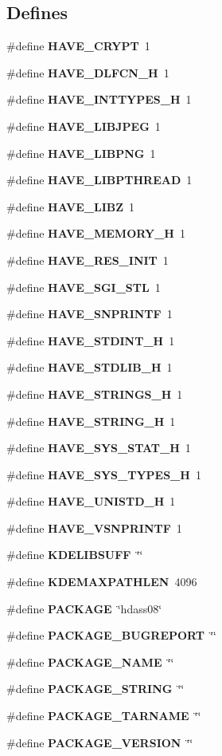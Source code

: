 \subsection*{Defines}
\begin{CompactItemize}
\item 
\#define {\bf HAVE\_\-CRYPT}\ 1
\item 
\#define {\bf HAVE\_\-DLFCN\_\-H}\ 1
\item 
\#define {\bf HAVE\_\-INTTYPES\_\-H}\ 1
\item 
\#define {\bf HAVE\_\-LIBJPEG}\ 1
\item 
\#define {\bf HAVE\_\-LIBPNG}\ 1
\item 
\#define {\bf HAVE\_\-LIBPTHREAD}\ 1
\item 
\#define {\bf HAVE\_\-LIBZ}\ 1
\item 
\#define {\bf HAVE\_\-MEMORY\_\-H}\ 1
\item 
\#define {\bf HAVE\_\-RES\_\-INIT}\ 1
\item 
\#define {\bf HAVE\_\-SGI\_\-STL}\ 1
\item 
\#define {\bf HAVE\_\-SNPRINTF}\ 1
\item 
\#define {\bf HAVE\_\-STDINT\_\-H}\ 1
\item 
\#define {\bf HAVE\_\-STDLIB\_\-H}\ 1
\item 
\#define {\bf HAVE\_\-STRINGS\_\-H}\ 1
\item 
\#define {\bf HAVE\_\-STRING\_\-H}\ 1
\item 
\#define {\bf HAVE\_\-SYS\_\-STAT\_\-H}\ 1
\item 
\#define {\bf HAVE\_\-SYS\_\-TYPES\_\-H}\ 1
\item 
\#define {\bf HAVE\_\-UNISTD\_\-H}\ 1
\item 
\#define {\bf HAVE\_\-VSNPRINTF}\ 1
\item 
\#define {\bf KDELIBSUFF}\ \char`\"{}\char`\"{}
\item 
\#define {\bf KDEMAXPATHLEN}\ 4096
\item 
\#define {\bf PACKAGE}\ \char`\"{}hdass08\char`\"{}
\item 
\#define {\bf PACKAGE\_\-BUGREPORT}\ \char`\"{}\char`\"{}
\item 
\#define {\bf PACKAGE\_\-NAME}\ \char`\"{}\char`\"{}
\item 
\#define {\bf PACKAGE\_\-STRING}\ \char`\"{}\char`\"{}
\item 
\#define {\bf PACKAGE\_\-TARNAME}\ \char`\"{}\char`\"{}
\item 
\#define {\bf PACKAGE\_\-VERSION}\ \char`\"{}\char`\"{}

\end{CompactItemize}
